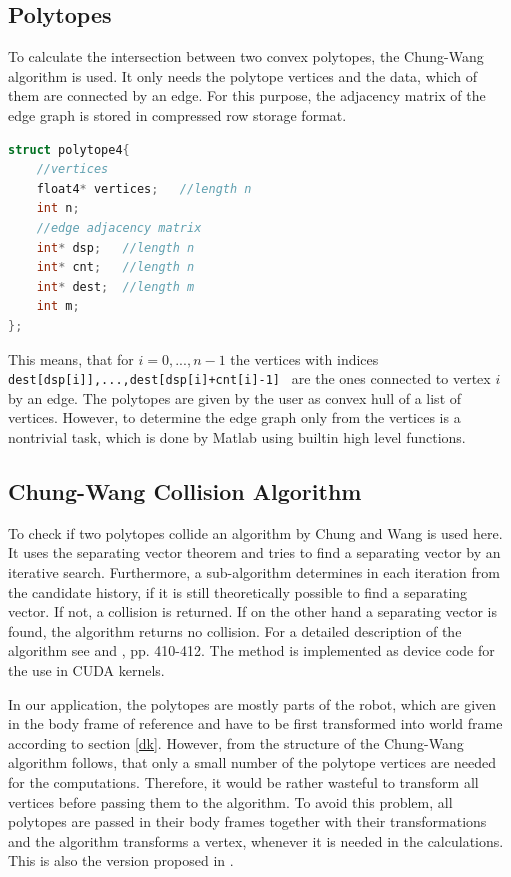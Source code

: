 \documentclass[twocolumn]{svjour3}
\begin{document}
\subsection{Polytopes}

To calculate the intersection between two convex polytopes, the Chung-Wang algorithm \cite{chung} is used. It only needs the polytope vertices 
and the data, which of them are connected by an edge. 
For this purpose, the adjacency matrix of the edge graph is stored in compressed row storage format.

\footnotesize
\begin{lstlisting}[language=C++, frame=single,
	caption=Storing polytopes in CRS format.,
	label=code3
]
struct polytope4{
    //vertices
    float4* vertices;	//length n
    int n; 	
    //edge adjacency matrix
    int* dsp;	//length n
    int* cnt;	//length n
    int* dest;	//length m
    int m;
};
\end{lstlisting}
\normalsize

This means, that for $i=0,...,n-1$ the vertices with indices \texttt{ dest[dsp[i]],...,dest[dsp[i]+cnt[i]-1] } are the ones connected to vertex $i$ by an edge.
The polytopes are given by the user as convex hull of a list of vertices. However, to determine the edge graph only from the vertices is a nontrivial task, which is done by Matlab using builtin high level functions.


\subsection{Chung-Wang Collision Algorithm}

To check if two polytopes collide an algorithm by Chung and Wang \cite{chung} is used here. It uses the separating vector theorem and tries to find a separating vector by an iterative search. Furthermore, a sub-algorithm determines in each iteration from the candidate history, if it is still theoretically possible to find a separating vector. 
If not, a collision is returned.
If on the other hand a separating vector is found, the algorithm returns no collision.
For a detailed description of the algorithm see \cite{chung} and \cite{ericson}, pp. 410-412.
The method is implemented as device code for the use in CUDA kernels.

In our application, the polytopes are mostly parts of the robot, which are given in the body frame of reference and have to be first transformed into world frame according to section \ref{dk}.
However, from the structure of the Chung-Wang algorithm follows, that only a small number of the polytope vertices are needed for the computations. 
Therefore, it would be rather wasteful to transform all vertices before passing them to the algorithm. 
To avoid this problem, all polytopes are passed in their body frames together with their transformations 
and the algorithm transforms a vertex, whenever it is needed in the calculations.
This is also the version proposed in \cite{chung}.
\end{document}
